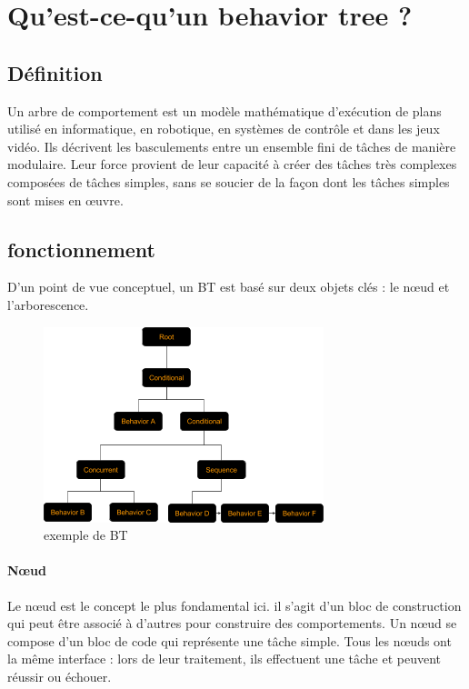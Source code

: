 \documentclass[titlepage]{article}
\begin{document}
	\section{Qu'est-ce-qu'un behavior tree ?}
		\subsection{Définition}
		Un arbre de comportement est un modèle mathématique d'exécution de plans utilisé en informatique, en robotique, en systèmes de contrôle et dans les jeux vidéo. Ils décrivent les basculements entre un ensemble fini de tâches de manière modulaire. Leur force provient de leur capacité à créer des tâches très complexes composées de tâches simples, sans se soucier de la façon dont les tâches simples sont mises en œuvre. \cite{wikipedia_BT}
		\subsection{fonctionnement}
		
		D'un point de vue conceptuel, un BT est basé sur deux objets clés : le nœud et l'arborescence.
		
		\begin{figure}[h!]
			\includegraphics[width=\linewidth]{img/behavior_trees_example.png}
			\caption{exemple de BT \cite{rasmussen}}
			\label{fig:BT1}
		\end{figure}
		
		\paragraph{Nœud}
		Le nœud est le concept le plus fondamental ici. il s'agit d'un bloc de construction qui peut être associé à d'autres pour construire des comportements. Un nœud se compose d'un bloc de code qui représente une tâche simple. Tous les nœuds ont la même interface : lors de leur traitement, ils effectuent une tâche et peuvent réussir ou échouer.
		
\end{document}
